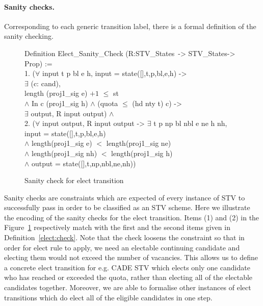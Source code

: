 \documentclass{llncs}
\begin{document}
\paragraph{Sanity checks.} 
Corresponding to each generic transition label, there is a formal definition of the sanity checking. 
\begin{scriptsize}
\begin{figure}[b]
{\selectfont
 Definition Elect\_Sanity\_Check (R:STV\_States~-> STV\_States-> Prop) :=\\
   1. ($\forall$ \textsf{input} t p bl e h, \textsf{input} = \textsf{state}([],t,p,bl,e,h) ->\\
    \hspace*{0.3cm} $\exists$ (c: cand),\\
    \hspace*{0.5cm} \textsf{length} (proj1\_sig e) $+ 1$  $\leq$ st \\
   \hspace*{0.5cm} $\wedge$ In c (proj1\_sig h) $\wedge$ (quota $\leq$ (hd nty t) c) -> \\
   \hspace*{1cm} $\exists$ \textsf{output}, R \textsf{input} \textsf{output}) $\wedge$\\
  2. ($\forall$ \textsf{input} \textsf{output}, R \textsf{input} \textsf{output} -> $\exists$ t p np bl nbl e ne h nh,\\
   \hspace*{0.3cm} \textsf{input} = \textsf{state}([],t,p,bl,e,h) \\
   \hspace*{0.45cm}$\wedge$ \textsf{length}(proj1\_sig e) $<$ \textsf{length}(proj1\_sig ne)\\ 
   \hspace*{0.45cm}$\wedge$ \textsf{length}(proj1\_sig nh) $<$ \textsf{length}(proj1\_sig h) \\
  \hspace*{0.5cm}$\wedge$ \textsf{output} = \textsf{state}([],t,np,nbl,ne,nh))
           
}
\caption{Sanity check for elect transition}
\label{fig;fig.2}
\end{figure}
\end{scriptsize}
Sanity checks are constraints which are expected of every instance
of STV to successfully pass in order to be classified as an STV
scheme. Here we illustrate the encoding of the sanity checks for the
elect transition. Items (1) and (2) in the Figure~\ref{fig;fig.2}
respectively match with the first and the second items given in
Definition~\ref{elect:check}. Note that the check loosens the
constraint so that in order for elect rule to apply, we need an
electable continuing candidate and electing them would not exceed
the number of vacancies. This allows us to define a concrete
elect transition for e.g. CADE STV \cite{Beckert:2013:AVC} which elects only one candidate who has reached or exceeded the quota, rather than electing all of the electable candidates together. Moreover, we are able to formalise other instances of elect transitions which do elect all of the eligible candidates in one step. 
\end{document}
